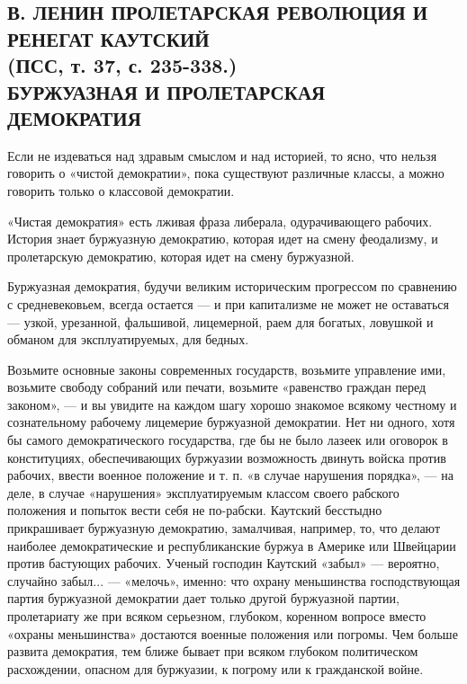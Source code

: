 \documentclass[12pt]{article}
\newcommand{\parnum}{(\arabic{parcount})}
\newcounter{parcount}
\newenvironment{parnumbers}{%
  \par%
  \everypar{\noindent \stepcounter{parcount}\marginpar[]{\parnum}}%
}{}
\begin{document}
\subsection{В. ЛЕНИН ПРОЛЕТАРСКАЯ РЕВОЛЮЦИЯ И РЕНЕГАТ КАУТСКИЙ\\
    (ПСС, т. 37, с. 235-338.)\\
    БУРЖУАЗНАЯ И ПРОЛЕТАРСКАЯ ДЕМОКРАТИЯ}
\begin{parnumbers}
Если не издеваться над здравым смыслом и над историей, то ясно, что нельзя говорить о «чистой демократии», пока существуют различные классы, а можно говорить только о классовой демократии.

«Чистая демократия» есть лживая фраза либерала, одурачивающего рабочих. История знает буржуазную демократию, которая идет на смену феодализму, и пролетарскую демократию, которая идет на смену буржуазной.

Буржуазная демократия, будучи великим историческим прогрессом по сравнению с средневековьем, всегда остается — и при капитализме не может не оставаться — узкой, урезанной, фальшивой, лицемерной, раем для богатых, ловушкой и обманом для эксплуатируемых, для бедных.

Возьмите основные законы современных государств, возьмите управление ими, возьмите свободу собраний или печати, возьмите «равенство граждан перед законом», — и вы увидите на каждом шагу хорошо знакомое всякому честному и сознательному рабочему лицемерие буржуазной демократии. Нет ни одного, хотя бы самого демократического государства, где бы не было лазеек или оговорок в конституциях, обеспечивающих буржуазии возможность двинуть войска против рабочих, ввести военное положение и т. п. «в случае нарушения порядка», — на деле, в случае «нарушения» эксплуатируемым классом своего рабского положения и попыток вести себя не по-рабски. Каутский бесстыдно прикрашивает буржуазную демократию, замалчивая, например, то, что делают наиболее демократические и республиканские буржуа в Америке или Швейцарии против бастующих рабочих. Ученый господин Каутский «забыл» — вероятно, случайно забыл... — «мелочь», именно: что охрану меньшинства господствующая партия буржуазной демократии дает только другой буржуазной партии, пролетариату же при всяком серьезном, глубоком, коренном вопросе вместо «охраны меньшинства» достаются военные положения или погромы. Чем больше развита демократия, тем ближе бывает при всяком глубоком политическом расхождении, опасном для буржуазии, к погрому или к гражданской войне.


\end{parnumbers}
\end{document}
